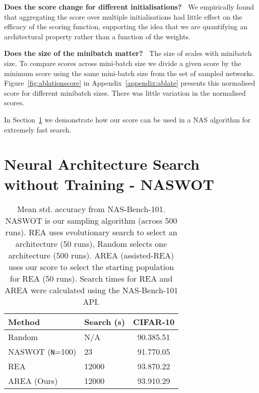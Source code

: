 \documentclass{article}
\begin{document}
\textbf{Does the score change for different initialisations?\ } We empirically found that aggregating the score over multiple initialisations had little effect on the efficacy of the scoring function, supporting the idea that we are quantifying an architectural property rather than a function of the weights. 



\textbf{Does the size of the minibatch matter?\ } The size of  scales with minibatch size. To compare scores across mini-batch size we divide a given score by the minimum score using the same mini-batch size from the set of sampled networks.  
Figure~\ref{fig:ablationscore} in Appendix~\ref{appendix:ablate} presents this normalised score for different minibatch sizes. There was little variation in the normalised scores.



In Section~\ref{sec:nas} we demonstrate how our score can be used in a NAS algorithm for extremely fast search.





\section{Neural Architecture Search without Training - NASWOT}
\label{sec:nas}


\begin{table}
\caption{Mean  std. accuracy from NAS-Bench-101. NASWOT is our sampling algorithm (across 500 runs). REA uses evolutionary search to select an architecture (50 runs), Random selects one architecture (500 runs). AREA (assisted-REA) uses our score to select the starting population for REA (50 runs).  Search times for REA and AREA were calculated using the NAS-Bench-101 API.}
\vspace{2mm}
\label{table:benchmarking101}
\centering
    \begin{tabular}{@{}llc@{}} \hline 
    Method & Search (s)  & CIFAR-10 \\
    \midrule
    Random & N/A &  90.385.51 \\
    NASWOT (\texttt{N}=100) & 23  & 91.770.05 \\
    REA      &  12000  & 93.870.22 \\
    AREA (Ours) &  12000  & 93.910.29 \\
    \midrule
    \end{tabular}
\end{table}
\end{document}
